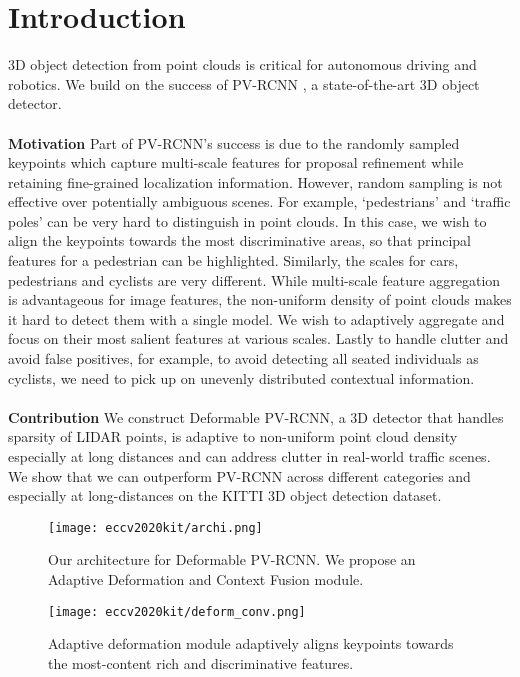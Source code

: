 \documentclass[runningheads]{llncs}
\begin{document}
\section{Introduction}
3D object detection from point clouds is critical for autonomous driving and robotics. We build on the success of PV-RCNN \cite{PVRCNN}, a state-of-the-art 3D object detector. 
\\ \\ \textbf{Motivation} Part of PV-RCNN’s success is due to the randomly sampled keypoints which capture multi-scale features for proposal refinement while retaining fine-grained localization information. However, random sampling is not effective over potentially ambiguous scenes. For example, ‘pedestrians’ and ‘traffic poles’ can be very hard to distinguish in point clouds. In this case, we wish to align the keypoints towards the most discriminative areas, so that principal features for a pedestrian can be highlighted. Similarly, the scales for cars, pedestrians and cyclists are very different. While multi-scale feature aggregation is advantageous for image features, the non-uniform density of point clouds makes it hard to detect them with a single model. We wish to adaptively aggregate and focus on their most salient features at various scales. Lastly to handle clutter and avoid false positives, for example, to avoid detecting all seated individuals as cyclists, we need to pick up on unevenly distributed contextual information. 
\\ \\ \textbf{Contribution} We construct Deformable PV-RCNN, a 3D detector that handles sparsity of LIDAR points, is adaptive to non-uniform point cloud density especially at long distances and can address clutter in real-world traffic scenes. We show that we can outperform PV-RCNN across different categories and especially at long-distances on the KITTI 3D object detection dataset.

\begin{figure}[t]
\centering
\texttt{[image: eccv2020kit/archi.png]}
\caption{Our architecture for Deformable PV-RCNN. We propose an Adaptive Deformation and Context Fusion module.}
\label{fig:full}
\end{figure}

\begin{figure}[t]
\centering
\texttt{[image: eccv2020kit/deform\_conv.png]}
\caption{Adaptive deformation module adaptively aligns keypoints towards the most-content rich and discriminative features.}
\label{fig:def}
\end{figure}
\end{document}

